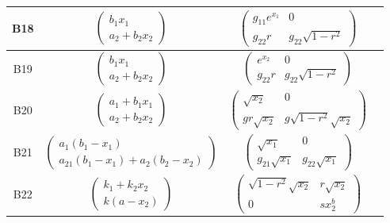 \documentclass{article}
\begin{document}
\begin{table}[h!]
\begin{tabular}{|c|c|c|c|}
\hline
B18 & 
$\left( \begin{array}{c} b_1x_1\\ a_2+b_2x_2 \end{array} \right)$ & 
$\left( \begin{array}{cc} g_{11}e^{x_1} & 0\\ g_{22}r & g_{22}\sqrt{1-r^2} \end{array} \right)$ & 
\\

\hline
B19 & 
$\left( \begin{array}{c} b_1x_1\\ a_2+b_2x_2 \end{array} \right)$ & 
$\left( \begin{array}{cc} e^{x_2} & 0\\ g_{22}r & g_{22}\sqrt{1-r^2} \end{array} \right)$ & 
\\

\hline
B20 & 
$\left( \begin{array}{c} a_1+b_1x_1\\ a_2+b_2x_2 \end{array} \right)$ & 
$\left( \begin{array}{cc} \sqrt{x_2} & 0\\ gr\sqrt{x_2} & g\sqrt{1-r^2}\sqrt{x_2} \end{array} \right)$ & 
\\

\hline
B21 & 
$\left( \begin{array}{c} a_1(b_1-x_1)\\ a_{21}(b_1-x_1)+a_2(b_2-x_2) \end{array} \right)$ & 
$\left( \begin{array}{cc} \sqrt{x_1} & 0\\ g_{21}\sqrt{x_1} & g_{22}\sqrt{x_1} \end{array} \right)$ & 
\\

\hline
B22 & 
$\left( \begin{array}{c} k_1+k_2x_2\\ k(a-x_2) \end{array} \right)$ & 
$\left( \begin{array}{cc} \sqrt{1-r^2}\sqrt{x_2} & r\sqrt{x_2}\\ 0 & sx_2^b \end{array} \right)$ & 
\\
\hline

\end{tabular}
\end{table}
\clearpage


 
\end{document}
